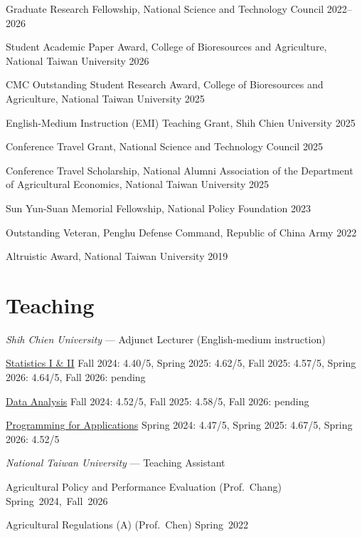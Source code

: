 \documentclass[11pt,letterpaper]{article}
\begin{document}
Graduate Research Fellowship, National Science and Technology Council \hfill \mbox{2022--2026}

Student Academic Paper Award, College of Bioresources and Agriculture, National Taiwan University \hfill \mbox{2026}

CMC Outstanding Student Research Award, College of Bioresources and Agriculture, National Taiwan University \hfill \mbox{2025}

English-Medium Instruction (EMI) Teaching Grant, Shih Chien University \hfill \mbox{2025}

Conference Travel Grant, National Science and Technology Council \hfill \mbox{2025}

Conference Travel Scholarship, National Alumni Association of the Department of Agricultural Economics, National Taiwan University \hfill \mbox{2025}

Sun Yun-Suan Memorial Fellowship, National Policy Foundation \hfill \mbox{2023}

Outstanding Veteran, Penghu Defense Command, Republic of China Army \hfill \mbox{2022}

Altruistic Award, National Taiwan University \hfill \mbox{2019}

\hypertarget{teaching}{%
\section{Teaching}\label{teaching}}

\emph{Shih Chien University} --- Adjunct Lecturer (English-medium instruction)

\href{https://yyliou.github.io/stat}{Statistics I \& II}
\newline Fall 2024: 4.40/5, Spring 2025: 4.62/5, Fall 2025: 4.57/5, Spring 2026: 4.64/5, Fall 2026: pending

\href{https://yyliou.github.io/da}{Data Analysis}
\newline Fall 2024: 4.52/5, Fall 2025: 4.58/5, Fall 2026: pending

\href{https://yyliou.github.io/pa}{Programming for Applications}
\newline Spring 2024: 4.47/5, Spring 2025: 4.67/5, Spring 2026: 4.52/5

\emph{National Taiwan University} --- Teaching Assistant

Agricultural Policy and Performance Evaluation (Prof.~Chang) \hfill \mbox{Spring 2024, Fall 2026}

Agricultural Regulations (A) (Prof.~Chen) \hfill \mbox{Spring 2022}
\end{document}
